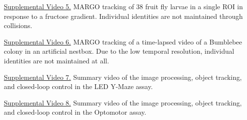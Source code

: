 \documentclass[10pt]{article}
\begin{document}
\noindent
\href{https://youtu.be/sxQMXHJoG24}{Supplemental Video 5.} MARGO tracking of 38 fruit fly larvae in a single ROI in response to a fructose gradient. Individual identities are not maintained through collisions.
\newline

\noindent
\href{https://youtu.be/FVIXQSdiWx0}{Supplemental Video 6.} MARGO tracking of a time-lapsed video of a Bumblebee colony in an artificial nestbox. Due to the low temporal resolution, individual identities are not maintained at all.
\newline

\noindent
\href{https://youtu.be/PqPJA6hsabE}{Supplemental Video 7.} Summary video of the image processing, object tracking, and closed-loop control in the LED Y-Maze assay.
\newline

\noindent
\href{https://youtu.be/uxgswI8jEWY}{Supplemental Video 8.} Summary video of the image processing, object tracking, and closed-loop control in the Optomotor assay.
\newline
\end{document}
